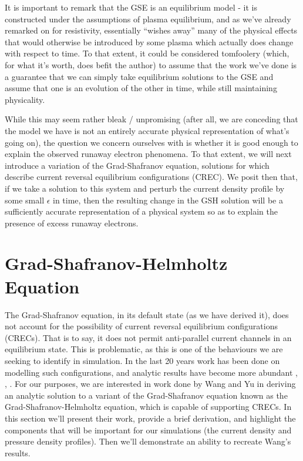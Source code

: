 It is important to remark that the GSE is an equilibrium model - it is constructed under the assumptions of plasma equilibrium, and as we've 
already remarked on for resistivity, essentially ``wishes away'' many of the physical effects that would otherwise be introduced by some plasma which actually does 
change with respect to time. To that extent, 
it could be considered tomfoolery (which, for what it's worth, does befit the author) to assume that the work we've done is a guarantee that 
we can simply take equilibrium solutions to the GSE and assume that one is an evolution of the other in time, while still maintaining physicality.

While this may seem rather bleak / unpromising (after all, we are conceding that the model we have is not an entirely accurate 
physical representation of what's going on), the question we concern ourselves with is whether it is good enough to explain 
the observed runaway electron phenomena. To that extent, we will next introduce a variation of the Grad-Shafranov equation, 
solutions for which describe current reversal equilibrium configurations (CREC). We posit then that, if we take a 
solution to this system and perturb the current density profile by some small $\epsilon$ in time, then the resulting 
change in the GSH solution will be a sufficiently accurate representation of a physical system so as to explain the 
presence of excess runaway electrons.

\section{Grad-Shafranov-Helmholtz Equation}

The Grad-Shafranov equation, in its default state (as we have derived it), does not account for the possibility of current 
reversal equilibrium configurations (CRECs). That is to say, it does not permit anti-parallel current channels in an equilibrium state. 
This is problematic, as this is one of the behaviours we are seeking to identify in simulation. In the last 20 years work has been done on 
modelling such configurations, and analytic results have become more abundant \cite{wang-analytic-solution}, \cite{crec-work-1}, \cite{crec-work-2}.
For our purposes, we are interested in work done by Wang and Yu in deriving an analytic solution to a variant of the Grad-Shafranov equation 
known as the Grad-Shafranov-Helmholtz equation, which is capable of supporting CRECs. In this section we'll present their work, provide a 
brief derivation, and highlight the components that will be important for our simulations (the current density and pressure density profiles). 
Then we'll demonstrate an ability to recreate Wang's results.

